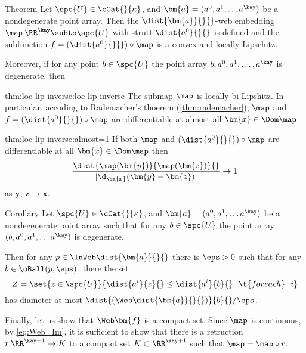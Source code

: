 \begin{thm}{Theorem}\label{thm:loc-lip-inverse}
Let $\spc{U}\in\cCat{}{\kappa}$,
and $\bm{a}=(a^0,a^1,\dots a^\kay)$ be a nondegenerate point array.
Then the $\dist{\bm{a}}{}{}$-web embedding $\map\:\RR^\kay\subto\spc{U}$ with strutt $\dist{a^0}{}{}$ is defined and the subfunction $f=(\dist{a^0}{}{})\circ\map$ is a convex and locally Lipschitz.

Moreover, if for any point $b\in\spc{U}$ 
the point array $b,a^0,a^1,\dots,a^\kay$ is degenerate, then  

\begin{subthm}{thm:loc-lip-inverse:loc-lip-inverse}
The submap $\map$  is locally bi-Lipshitz.
In particular, accoding to Rademacher's thoerem (\ref{thm:rademacher}),  
$\map$ and $f=(\dist{a^0}{}{})\circ\map$ are differentiable at almost all $\bm{x}\in\Dom\map$.
\end{subthm}

\begin{subthm}{thm:loc-lip-inverse:almost=1}
If both $\map$ and $(\dist{a^0}{}{})\circ\map$
are
differentiable
at all $\bm{x}\in \Dom\map$
then
$$
\frac{\dist{\map(\bm{y})}{\map(\bm{z})}{}}{|\d_{\bm{x}}(\bm{y}-\bm{z})|}
\to 1
$$
as $\bm{y}$, $\bm{z}\to \bm{x}$.
\end{subthm}
\end{thm}













\begin{thm}
{Corollary}
Let $\spc{U}\in\cCat{}{\kappa}$,
and $\bm{a}=(a^0,a^1,\dots a^\kay)$ be a nondegenerate point array
such that for any $b\in \spc{U}$ the  point array
$(b,a^0,a^1,\dots a^\kay)$ is degenerate.

Then for any $p\in\InWeb\dist{\bm{a}}{}{}$
there is $\eps>0$ such that
for any $b\in \oBall(p,\eps)$,
there the set 
$$Z=\set{z\in \spc{U}}{\dist{a^i}{z}{}\le\dist{a^i}{b}{} \ \ \t{for each}\ \ i}$$
has diameter at most $\dist{(\Web\dist{\bm{a}}{}{})}{b}{}/\eps$.

\end{thm}









Finally, let us show that $\Web\bm{f}$ is a compact set.
Since $\map$ is continuous, by \ref{eq:Web=Im}, it is sufficient to show that
there is a retruction $r\:\RR^{\kay+1}\to K$ to a compact set $K\subset \RR^{\kay+1}$
such that $\map=\map\circ r$.

